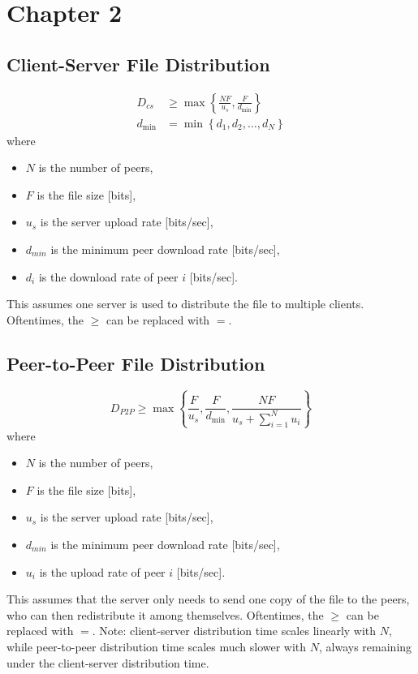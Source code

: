 \section{Chapter 2}

\subsection{Client-Server File Distribution}
\begin{align*}
    D_{cs}       & \geq \max\left\{\frac{NF}{u_s}, \frac{F}{d_\text{min}}\right\} \\
    d_\text{min} & = \min\left\{d_1, d_2, \ldots, d_N\right\}
\end{align*}
where
\begin{itemize}
    \item $N$ is the number of peers,
    \item $F$ is the file size [bits],
    \item $u_s$ is the server upload rate [bits/sec],
    \item $d_{min}$ is the minimum peer download rate [bits/sec],
    \item $d_i$ is the download rate of peer $i$ [bits/sec].
\end{itemize}
This assumes one server is used to distribute the file to multiple clients. Oftentimes, the $\geq$ can be replaced with $=$.
\subsection{Peer-to-Peer File Distribution}
\begin{equation*}
    D_{P2P} \geq \max\left\{\frac{F}{u_s}, \frac{F}{d_\text{min}}, \frac{NF}{u_s + \sum_{i=1}^{N} u_i}\right\}
\end{equation*}
where
\begin{itemize}
    \item $N$ is the number of peers,
    \item $F$ is the file size [bits],
    \item $u_s$ is the server upload rate [bits/sec],
    \item $d_{min}$ is the minimum peer download rate [bits/sec],
    \item $u_i$ is the upload rate of peer $i$ [bits/sec].
\end{itemize}
This assumes that the server only needs to send one copy of the file to the peers, who can then redistribute it among themselves. Oftentimes, the $\geq$ can be replaced with $=$.
Note: client-server distribution time scales linearly with $N$, while peer-to-peer distribution time scales much slower with $N$, always remaining under the client-server distribution time.